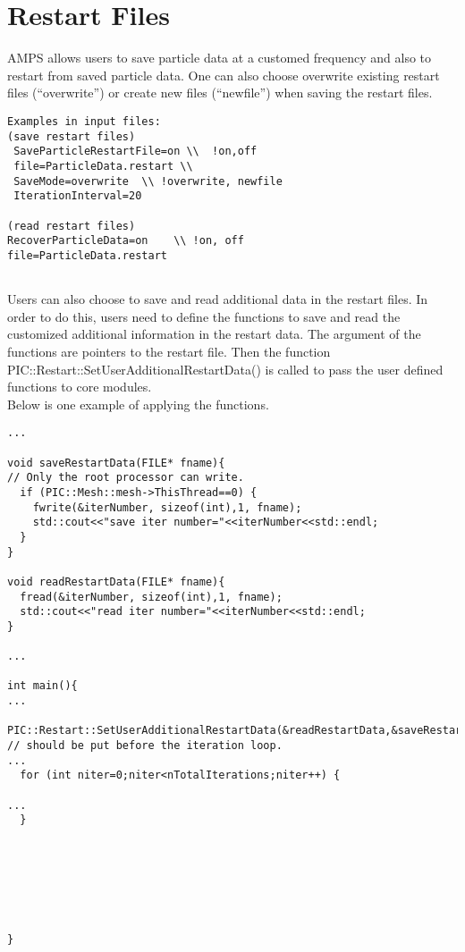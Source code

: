 \section {Restart Files}
AMPS allows users to save particle data at a customed frequency and also to restart from saved particle data. One can also choose overwrite existing restart files (``overwrite'') or create new files (``newfile'') when saving the restart files. \\
\begin{verbatim}
Examples in input files:
(save restart files)
 SaveParticleRestartFile=on \\  !on,off
 file=ParticleData.restart \\
 SaveMode=overwrite  \\ !overwrite, newfile
 IterationInterval=20

(read restart files)
RecoverParticleData=on    \\ !on, off
file=ParticleData.restart
 
\end{verbatim}
Users can also choose to save and read additional data in the restart files. In order to do this, users need to define the functions to save and read the customized additional information in the restart data. The argument of the functions are pointers to the restart file. Then the function PIC::Restart::SetUserAdditionalRestartData() is called to  pass the user defined functions to core modules. \\
Below is one example of applying the functions.
\begin{verbatim} 
...

void saveRestartData(FILE* fname){
// Only the root processor can write.
  if (PIC::Mesh::mesh->ThisThread==0) {
    fwrite(&iterNumber, sizeof(int),1, fname);
    std::cout<<"save iter number="<<iterNumber<<std::endl;
  }
}

void readRestartData(FILE* fname){
  fread(&iterNumber, sizeof(int),1, fname);
  std::cout<<"read iter number="<<iterNumber<<std::endl;
}

...

int main(){
...
 PIC::Restart::SetUserAdditionalRestartData(&readRestartData,&saveRestartData);         
// should be put before the iteration loop.
...
  for (int niter=0;niter<nTotalIterations;niter++) {

...
  }







}

\end{verbatim}
